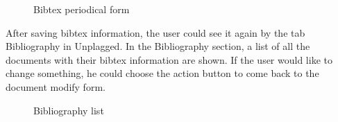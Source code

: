 \begin{figure}[!h]
  \centering
  \caption{Bibtex periodical form}
  \label{fig:Bibtex_periodical_form}
\end{figure}

After saving bibtex information, the user could see it again by the tab Bibliography in Unplagged. In the Bibliography section, a list of all the documents with their bibtex information are shown. If the user would like to change something, he could choose the action button to come back to the document modify form.

\begin{figure}[!h]
  \centering
  \caption{Bibliography list}
  \label{fig:Bibliography_list}
\end{figure}


